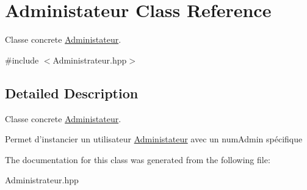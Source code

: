\hypertarget{classAdministateur}{\section{Administateur Class Reference}
\label{classAdministateur}
}


Classe concrete \hyperlink{classAdministateur}{Administateur}.  




{\ttfamily \#include $<$Administrateur.\-hpp$>$}



\subsection{Detailed Description}
Classe concrete \hyperlink{classAdministateur}{Administateur}. 

Permet d'instancier un utilisateur \hyperlink{classAdministateur}{Administateur} avec un num\-Admin spécifique 

The documentation for this class was generated from the following file\-:\begin{DoxyCompactItemize}
\item 
Administrateur.\-hpp\end{DoxyCompactItemize}
